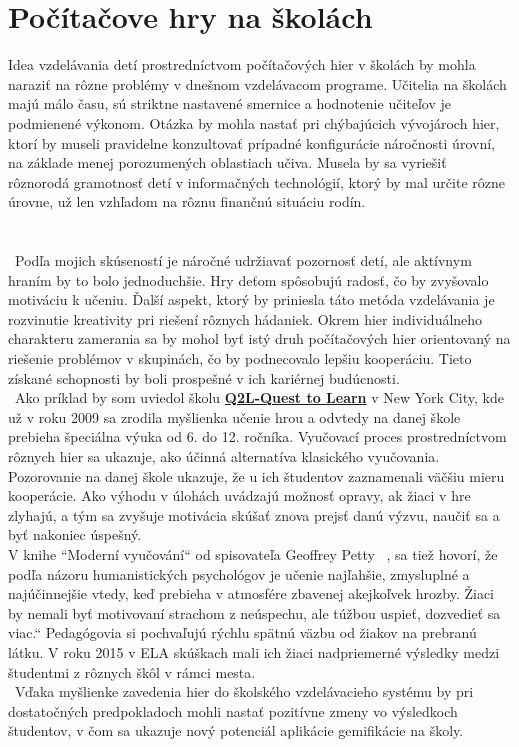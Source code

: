 
\section{Počítačove hry na školách}\label{hry-na-skolach-hodiny-programovania}
Idea vzdelávania detí prostredníctvom počítačových hier v školách by mohla naraziť na 
rôzne problémy v dnešnom vzdelávacom programe. Učitelia na školách majú málo času, sú striktne 
nastavené smernice a hodnotenie učiteľov je podmienené výkonom. Otázka by mohla nastať pri chýbajúcich 
vývojároch hier, ktorí by museli pravidelne konzultovať prípadné konfigurácie náročnosti úrovní, na 
základe menej porozumených oblastiach učiva. Musela by sa vyriešiť rôznorodá gramotnosť detí v informačných 
technológií, ktorý by mal určite rôzne úrovne, už len vzhľadom na rôznu finančnú situáciu rodín.\\\\\\
\indent~Podľa mojich skúseností je náročné udržiavať pozornosť detí, ale aktívnym hraním by to bolo jednoduchšie. Hry 
deťom spôsobujú radosť, čo by zvyšovalo motiváciu k učeniu. Ďalší aspekt, ktorý by priniesla táto metóda vzdelávania 
je rozvinutie kreativity pri riešení rôznych hádaniek. Okrem hier individuálneho charakteru zamerania sa 
by mohol byť istý druh počítačových hier orientovaný na riešenie problémov v skupinách, čo by podnecovalo 
lepšiu kooperáciu. Tieto získané schopnosti by boli prospešné v ich kariérnej budúcnosti.\\
\indent~Ako príklad by som uviedol školu \textbf{\href{https://www.q2l.org/}{Q2L-Quest to Learn}} v New York City, kde už v roku 2009 sa 
zrodila myšlienka učenie hrou a odvtedy na danej škole prebieha špeciálna výuka od 6. do 12. ročníka. 
Vyučovací proces prostredníctvom rôznych hier sa ukazuje, ako účinná alternatíva klasického vyučovania.
Pozorovanie na danej škole ukazuje, že u ich študentov zaznamenali väčšiu mieru kooperácie. Ako výhodu v úlohách uvádzajú 
možnosť opravy, ak žiaci v hre zlyhajú, a tým sa zvyšuje motivácia skúšať znova prejsť danú výzvu, naučiť 
sa a byť nakoniec úspešný. \\
V knihe ``Moderní vyučování`` od spisovateľa Geoffrey Petty ~\cite{pettyEd}, sa tiež hovorí, že podľa názoru humanistických psychológov je učenie 
najľahšie, zmysluplné a najúčinnejšie vtedy, keď prebieha v atmosfére zbavenej akejkoľvek hrozby. Žiaci by nemali byť motivovaní strachom 
z neúspechu, ale túžbou uspieť, dozvedieť sa viac.“ Pedagógovia si pochvaľujú rýchlu spätnú väzbu od žiakov na prebranú látku. 
V roku 2015 v ELA skúškach mali ich žiaci nadpriemerné výsledky medzi študentmi z rôznych škôl v rámci mesta.\\
\indent~Vďaka myšlienke zavedenia hier do školského vzdelávacieho systému by pri dostatočných predpokladoch mohli nastať pozitívne 
zmeny vo výsledkoch študentov, v čom sa ukazuje nový potenciál aplikácie gemifikácie na školy.

